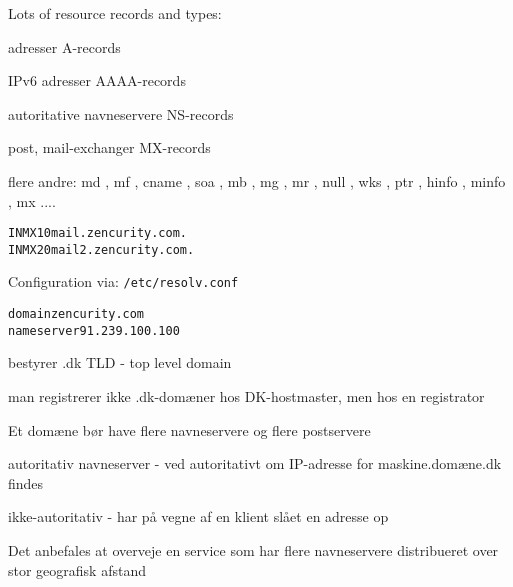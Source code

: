 \documentclass[Screen16to9,17pt]{foils}
\begin{document}

\begin{list1}
  \item Lots of resource records and types:
    \begin{list2}
\item adresser A-records
\item IPv6 adresser AAAA-records
\item autoritative navneservere NS-records
\item post, mail-exchanger MX-records
\item flere andre: md ,  mf ,  cname ,  soa ,
                  mb , mg ,  mr ,  null ,  wks ,  ptr ,
                  hinfo ,  minfo ,  mx ....
\end{list2}
\end{list1}
\begin{alltt}
        IN      MX      10      mail.zencurity.com.
        IN      MX      20      mail2.zencurity.com.
\end{alltt}

Configuration via: \verb+/etc/resolv.conf+

\begin{alltt}
domain zencurity.com
nameserver 91.239.100.100
\end{alltt}





\begin{list1}
\item bestyrer .dk TLD - top level domain
\item man registrerer ikke .dk-domæner hos DK-hostmaster, men hos en
  registrator
\item Et domæne bør have flere navneservere og flere postservere
\item autoritativ navneserver - ved autoritativt om IP-adresse for
  maskine.domæne.dk findes
\item ikke-autoritativ - har på vegne af en klient slået en adresse op
\item Det anbefales at overveje en service som har flere navneservere distribueret
  over stor geografisk afstand
\end{list1}

\end{document}
